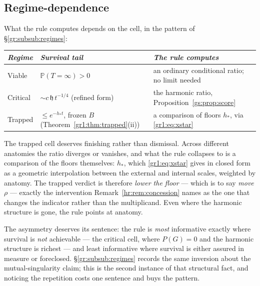 \documentclass[11pt]{article}
\numberwithin{equation}{section}
\theoremstyle{plain}
\theoremstyle{definition}
\theoremstyle{remark}
\newcommand{\PP}{\mathbb{P}}
\newcommand{\hm}{\mathfrak{h}}
\begin{document}
\subsection{Regime-dependence}\label{gs:sub:regimes}

What the rule computes depends on the cell, in the pattern of \S\ref{gr:subsub:regimes}:

\begin{center}\small
\begin{tabular}{@{}lll@{}}
\toprule
\emph{Regime} & \emph{Survival tail} & \emph{The rule computes} \\
\midrule
Viable & $\PP(T = \infty) > 0$ & an ordinary conditional ratio; no limit needed \\
Critical & $\sim c\,\hm\,t^{-1/4}$ (refined form) & the harmonic ratio, Proposition~\ref{gs:prop:score} \\
Trapped & $\le e^{-h_\ast t}$, frozen $B$ (Theorem~\ref{gr1:thm:trapped}(ii)) & a comparison of floors $h_\ast$, via \eqref{gr1:eq:xstar} \\
\bottomrule
\end{tabular}
\end{center}

The trapped cell deserves finishing rather than dismissal. Across different anatomies the ratio diverges or vanishes, and what the rule collapses to is a comparison of the floors themselves: $h_\ast$, which \eqref{gr1:eq:xstar} gives in closed form as a geometric interpolation between the external and internal scales, weighted by anatomy. The trapped verdict is therefore \emph{lower the floor} --- which is to say \emph{move $\rho$} --- exactly the intervention Remark~\ref{hr:rem:concession} names as the one that changes the indicator rather than the multiplicand. Even where the harmonic structure is gone, the rule points at anatomy.

The asymmetry deserves its sentence: the rule is \emph{most} informative exactly where survival is \emph{not} achievable --- the critical cell, where $P(G) = 0$ and the harmonic structure is richest --- and least informative where survival is either assured in measure or foreclosed. \S\ref{gr:subsub:regimes} records the same inversion about the mutual-singularity claim; this is the second instance of that structural fact, and noticing the repetition costs one sentence and buys the pattern.
\end{document}

